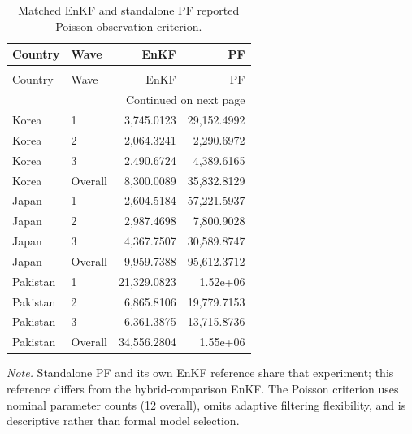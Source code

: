 \begingroup\small\setlength{\tabcolsep}{3pt}
\begin{longtable}{llrr}
\caption{Matched EnKF and standalone PF reported Poisson observation criterion.} \label{tab:s7} \\
\toprule
Country & Wave & EnKF & PF \\
\midrule
\endfirsthead
\caption[]{Matched EnKF and standalone PF reported Poisson observation criterion.} \\
\toprule
Country & Wave & EnKF & PF \\
\midrule
\endhead
\midrule
\multicolumn{4}{r}{Continued on next page} \\
\midrule
\endfoot
\bottomrule
\endlastfoot
Korea & 1 & 3,745.0123 & 29,152.4992 \\
Korea & 2 & 2,064.3241 & 2,290.6972 \\
Korea & 3 & 2,490.6724 & 4,389.6165 \\
Korea & Overall & 8,300.0089 & 35,832.8129 \\
Japan & 1 & 2,604.5184 & 57,221.5937 \\
Japan & 2 & 2,987.4698 & 7,800.9028 \\
Japan & 3 & 4,367.7507 & 30,589.8747 \\
Japan & Overall & 9,959.7388 & 95,612.3712 \\
Pakistan & 1 & 21,329.0823 & 1.52e+06 \\
Pakistan & 2 & 6,865.8106 & 19,779.7153 \\
Pakistan & 3 & 6,361.3875 & 13,715.8736 \\
Pakistan & Overall & 34,556.2804 & 1.55e+06 \\
\end{longtable}
\par\noindent\footnotesize\textit{Note.} Standalone PF and its own EnKF reference share that experiment; this reference differs from the hybrid-comparison EnKF. The Poisson criterion uses nominal parameter counts (12 overall), omits adaptive filtering flexibility, and is descriptive rather than formal model selection.
\endgroup
